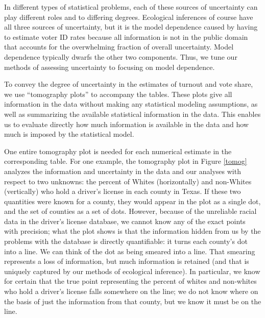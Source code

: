 \documentclass[12pt]{article}
\begin{document}
In different types of statistical problems, each of these sources of
uncertainty can play different roles and to differing degrees.
Ecological inferences of course have all three sources of uncertainty,
but it is the model dependence caused by having to estimate voter ID
rates because all information is not in the public domain that
accounts for the overwhelming fraction of overall uncertainty.  Model
dependence typically dwarfs the other two components. Thus, we tune
our methods of assessing uncertainty to focusing on model dependence.

To convey the degree of uncertainty in the estimates of turnout and
vote share, we use ``tomography plots'' to accompany the tables.
These plots give all information in the data without making any
statistical modeling assumptions, as well as summarizing the available
statistical information in the data. This enables us to evaluate
directly how much information is available in the data and how much
is imposed by the statistical model.

One entire tomography plot is needed for each numerical estimate in
the corresponding table. For one example, the tomography plot in
Figure \ref{tomog} analyzes the information and uncertainty in the
data and our analyses with respect to two unknowns: the percent of
Whites (horizontally) and non-Whites (vertically) who hold a driver's license in each county in Texas.
If these two
quantities were known for a county, they would appear in the plot as
a single dot, and the set of counties as a set of dots.  However,
because of the unreliable racial data in the driver's license database, we cannot know any of the exact points
with precision; what the plot shows is that the information hidden
from us by the problems with the database is directly quantifiable: it turns each
county's dot into a line.  We can think of the dot as being smeared
into a line. That smearing represents a loss of information, but much
information is retained (and that is uniquely captured by our methods
of ecological inference).  In particular, we know for certain that the
true point representing the percent of whites and non-whites who hold a driver's license
falls somewhere on the line; we do not know
where on the basis of just the information from that county, but we
know it must be on the line.
\end{document}
